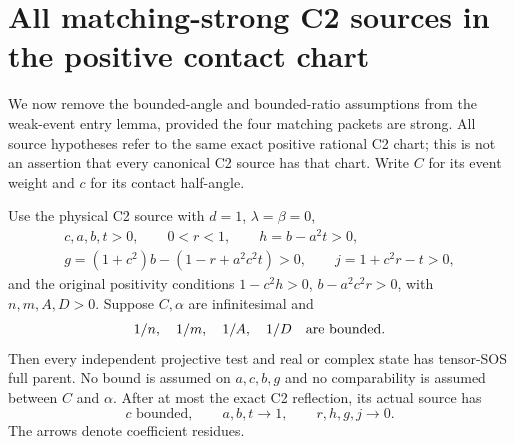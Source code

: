 \section{All matching-strong C2 sources in the positive contact chart}
\label{sec:matching-source-entry}

We now remove the bounded-angle and bounded-ratio assumptions from the
weak-event entry lemma, provided the four matching packets are strong.
All source hypotheses refer to the same exact positive rational C2 chart;
this is not an assertion that every canonical C2 source has that chart.
Write $C$ for its event weight and $c$ for its contact half-angle.

\begin{theorem}
Use the physical C2 source with $d=1$, $\lambda=\beta=0$,
\begin{gather*}
 c,a,b,t>0,\qquad 0<r<1,\qquad h=b-a^2t>0,\\
 g=(1+c^2)b-(1-r+a^2c^2t)>0,\qquad j=1+c^2r-t>0,
\end{gather*}
and the original positivity conditions
$1-c^2h>0$, $b-a^2c^2r>0$, with $n,m,A,D>0$.
Suppose $C,\alpha$ are infinitesimal and
\[
 1/n,\quad1/m,\quad1/A,\quad1/D
 \quad\hbox{are bounded}.
\]
Then every independent projective test and real or complex state has
 tensor-SOS full parent. No bound is assumed on $a,c,b,g$ and no
comparability is assumed between $C$ and $\alpha$.
After at most the exact C2 reflection, its actual source has
\[
 c\text{ bounded},\qquad a,b,t\longrightarrow1,
 \qquad r,h,g,j\longrightarrow0.
\]
The arrows denote coefficient residues.
\end{theorem}
